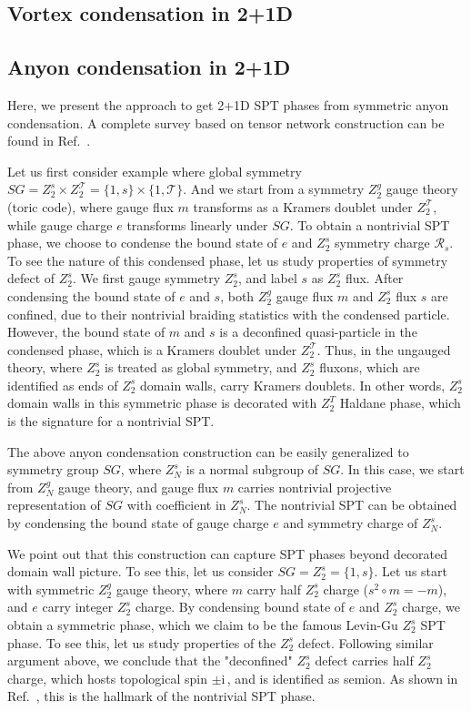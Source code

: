 \documentclass[reprint,amsmath,amssymb,aps,pra,]{revtex4-1}
\newcommand{\ii}{\mathrm{i}\,} %
\newcommand{\TT}{\mathcal{T}} %
\newcommand{\RR}{\mathcal{R}} %
\begin{document}
\subsection{Vortex condensation in 2+1D}

\subsection{Anyon condensation in 2+1D}\label{subapp:anyon_condensation}
Here, we present the approach to get 2+1D SPT phases from symmetric anyon condensation.
A complete survey based on tensor network construction can be found in Ref.~.

Let us first consider example where global symmetry $SG=Z_2^s\times Z_2^\TT=\{1,s\}\times\{1,\TT\}$.
And we start from a symmetry $Z_2^g$ gauge theory (toric code), where gauge flux $m$ transforms as a Kramers doublet under $Z_2^\TT$, while gauge charge $e$ transforms linearly under $SG$.
To obtain a nontrivial SPT phase,  we choose to condense the bound state of $e$ and $Z_2^s$ symmetry charge $\RR_s$.
To see the nature of this condensed phase, let us study properties of symmetry defect of $Z_2^s$.
We first gauge symmetry $Z_2^s$, and label $s$ as $Z_2^s$ flux.
After condensing the bound state of $e$ and $s$, both $Z_2^g$ gauge flux $m$ and $Z_2^s$ flux $s$ are confined, due to their nontrivial braiding statistics with the condensed particle.
However, the bound state of $m$ and $s$ is a deconfined quasi-particle in the condensed phase, which is a Kramers doublet under $Z_2^\TT$.
Thus, in the ungauged theory, where $Z_2^s$ is treated as global symmetry, and $Z_2^s$ fluxons, which are identified as ends of $Z_2^s$ domain walls, carry Kramers doublets.
In other words, $Z_2^s$ domain walls in this symmetric phase is decorated with $Z_2^T$ Haldane phase, which is the signature for a nontrivial SPT\cite{ChenLuVishwanath2014}.

The above anyon condensation construction can be easily generalized to symmetry group $SG$, where $Z_N^s$ is a normal subgroup of $SG$.
In this case, we start from $Z_N^g$ gauge theory, and gauge flux $m$ carries nontrivial projective representation of $SG$ with coefficient in $Z_N^s$.
The nontrivial SPT can be obtained by condensing the bound state of gauge charge $e$ and symmetry charge of $Z_N^s$.

We point out that this construction can capture SPT phases beyond decorated domain wall picture.
To see this, let us consider $SG=Z_2^s=\{1,s\}$. 
Let us start with symmetric $Z_2^g$ gauge theory, where $m$ carry half $Z_2^s$ charge ($s^2\circ m=-m$), and $e$ carry integer $Z_2^s$ charge.
By condensing bound state of $e$ and $Z_2^s$ charge, we obtain a symmetric phase, which we claim to be the famous Levin-Gu $Z_2^s$ SPT phase\cite{LevinGu2012}.
To see this, let us study properties of the $Z_2^s$ defect.
Following similar argument above, we conclude that the "deconfined" $Z_2^s$ defect carries half $Z_2^s$ charge, which hosts topological spin $\pm\ii$, and is identified as semion.
As shown in Ref.~, this is the hallmark of the nontrivial SPT phase.
\end{document}
